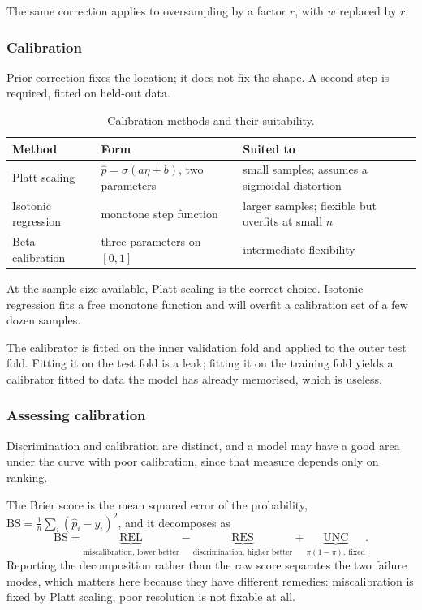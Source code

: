 \documentclass[12pt,a4paper,oneside]{report}
\begin{document}
The same correction applies to oversampling by a factor $r$, with $w$ replaced by $r$.

\subsubsection{Calibration}\label{sec:calibration}

Prior correction fixes the location; it does not fix the shape. A second step is required, fitted on held-out data.

\begin{table}[htbp]
\centering\small
\caption{Calibration methods and their suitability.}\label{tab:calibration-methods}
\begin{tabularx}{\textwidth}{@{}>{\raggedright\arraybackslash}p{3.4cm} >{\raggedright\arraybackslash}p{4.2cm} X@{}}
\toprule
\textbf{Method} & \textbf{Form} & \textbf{Suited to} \\
\midrule
Platt scaling & $\hat{p} = \sigma(a\eta + b)$, two parameters & small samples; assumes a sigmoidal distortion \\
Isotonic regression & monotone step function & larger samples; flexible but overfits at small $n$ \\
Beta calibration & three parameters on $[0,1]$ & intermediate flexibility \\
\bottomrule
\end{tabularx}
\end{table}

At the sample size available, Platt scaling is the correct choice. Isotonic regression fits a free monotone function and will overfit a calibration set of a few dozen samples.

The calibrator is fitted on the inner validation fold and applied to the outer test fold. Fitting it on the test fold is a leak; fitting it on the training fold yields a calibrator fitted to data the model has already memorised, which is useless.

\subsubsection{Assessing calibration}\label{sec:brier}

Discrimination and calibration are distinct, and a model may have a good area under the curve with poor calibration, since that measure depends only on ranking.

The Brier score is the mean squared error of the probability, $\mathrm{BS} = \frac{1}{n}\sum_i (\hat{p}_i - y_i)^2$, and it decomposes as
\begin{equation}
  \mathrm{BS} = \underbrace{\mathrm{REL}}_{\text{miscalibration, lower better}}
  - \underbrace{\mathrm{RES}}_{\text{discrimination, higher better}}
  + \underbrace{\mathrm{UNC}}_{\pi(1-\pi),\ \text{fixed}}.
\end{equation}
Reporting the decomposition rather than the raw score separates the two failure modes, which matters here because they have different remedies: miscalibration is fixed by Platt scaling, poor resolution is not fixable at all.
\end{document}

